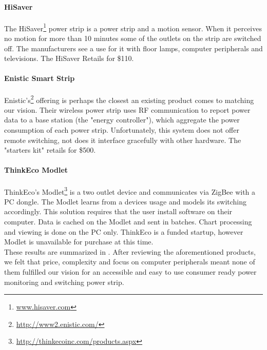 \paragraph{HiSaver} The HiSaver\footnote{\url{www.hisaver.com}} power strip is a power strip and a motion sensor. When it perceives no motion for more than 10 minutes some of the outlets on the strip are switched off. The manufacturers see a use for it with floor lamps, computer peripherals and televisions. The HiSaver Retails for \$110.

\paragraph{Enistic Smart Strip} Enistic's\footnote{\url{http://www2.enistic.com/}} offering is perhaps the closest an existing product comes to matching our vision. Their wireless power strip uses RF communication to report power data to a base station (the "energy controller"), which aggregate the power consumption of each power strip. Unfortunately, this system does not offer remote switching, not does it interface gracefully with other hardware. The "starters kit" retails for \$500.

\paragraph{ThinkEco Modlet} ThinkEco's Modlet\footnote{\url{http://thinkecoinc.com/products.aspx}} is a two outlet device and communicates via ZigBee with a PC dongle.  The Modlet learns from a devices usage and models its switching accordingly.  This solution requires that the user install software on their computer.  Data is cached on the Modlet and sent in batches.  Chart processing and viewing is done on the PC only.  ThinkEco is a funded startup, however Modlet is unavailable for purchase at this time.
\newline
\\
These results are summarized in .  After reviewing the aforementioned products, we felt that price, complexity and focus on computer peripherals meant none of them fulfilled our vision for an accessible and easy to use consumer ready power monitoring and switching power strip.\\

